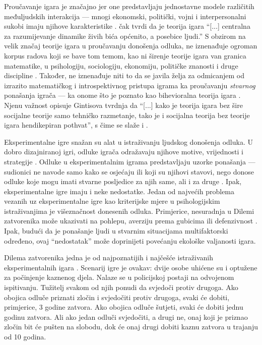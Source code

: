 \documentclass[a4paper, 12pt]{report}
\begin{document}
Proučavanje igara je značajno jer one predstavljaju jednostavne 
modele različitih međuljudskih interakcija
---  mnogi ekonomski, politički, vojni i
interpersonalni sukobi imaju  njihove karakteristike  \citep{worldexgame,colgt}. \citet[str. xiii]{gintbounds} čak
tvrdi da je teorija igara \enquote{[...] centralna za razumijevanje dinamike
    živih bića općenito, a posebice ljudi.} S obzirom na velik značaj teorije
igara u proučavanju donošenja odluka, ne iznenađuje ogroman korpus radova koji
se bave tom temom, kao ni širenje teorije igara van granica matematike, u
psihologiju, sociologiju, ekonomiju, političke znanosti i druge discipline
\citep{vlangsocrev}. Također, ne iznenađuje niti to da se javila želja za
odmicanjem od izrazito matematičkog i introspektivnog pristupa igrama ka
proučavanju \emph{stvarnog} ponašanja igrača --- ka onome što je poznato kao bihevioralna
teorija igara \citep{camerer2003}. Njenu važnost opisuje 
Gintisova \citeyearpar[str. xiii]{gintbounds}  tvrdnja da
\enquote{[...] kako je teorija igara bez šire socijalne teorije samo tehničko
    razmetanje, tako je i socijalna teorija bez teorije igara hendikepiran
    pothvat}, s čime se slaže i \citet[str. ix, par. 2]{colgt}. 

Eksperimentalne igre  snažan su alat u istraživanju ljudskog donošenja odluka. U
dobro dizajniranoj igri, odluke igrača odražavaju njihove motive, vrijednosti
i strategije \citep{worldexgame}. Odluke u eksperimentalnim igrama predstavljaju
uzorke ponašanja --- sudionici ne navode samo kako se osjećaju ili koji su
njihovi stavovi, nego donose odluke koje mogu imati stvarne posljedice za njih
same, ali i za druge \citep{worldexgame}. Ipak, eksperimentalne igre imaju i
neke nedostatke.
Jedan od najvećih problema vezanih uz eksperimentalne igre kao kriterijske mjere
u psihologijskim istraživanjima je višeznačnost donesenih odluka.
Primjerice, nesuradnja u Dilemi
zatvorenika može ukazivati na pohlepu, averziju prema gubicima ili defenzivnost
\citep{worldexgame, colgt}. Ipak, budući da je ponašanje ljudi u stvarnim
situacijama multifaktorski određeno, ovaj \enquote{nedostatak} može doprinijeti povećanju
ekološke valjanosti igara.

Dilema zatvorenika jedna je od najpoznatijih i najčešće istraživanih
eksperimentalnih igara \citep{colgt,
    van1998psychology, vancoop}. Scenarij
igre je ovakav: dvije osobe uhićene su i optužene za počinjenje kaznenog djela.
Nalaze se u policijskoj postaji na odvojenom ispitivanju. Tužitelj svakom od
njih ponudi da svjedoči protiv drugoga. Ako obojica odluče priznati zločin i
svjedočiti protiv drugoga, svaki će dobiti, primjerice, 3 godine zatvora. Ako
obojica odluče šutjeti, svaki će dobiti jednu godinu zatvora. Ali ako jedan
odluči svjedočiti, a drugi ne, onaj koji je priznao zločin bit će pušten na slobodu, dok će
onaj drugi dobiti kaznu zatvora u trajanju od 10 godina.
\end{document}
